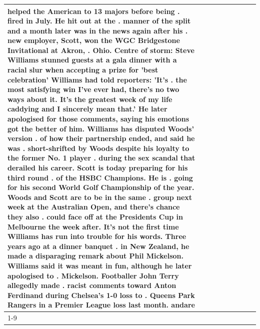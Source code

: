 \begin{table}[H]
\begin{tabular}{lllrlllll}
helped the American to 13 majors before being . fired in July. He hit out at the . manner of the split and a month later was in the news again after his . new employer, Scott, won the WGC Bridgestone Invitational at Akron, . Ohio. Centre of storm: Steve Williams stunned guests at a gala dinner with a racial slur when accepting a prize for 'best celebration' Williams had told reporters: 'It's . the most satisfying win I've ever had, there's no two ways about it. It's the greatest week of my life caddying and I sincerely mean that.' He later apologised for those comments, saying his emotions got the better of him. Williams has disputed Woods' version . of how their partnership ended, and said he was . short-shrifted by Woods despite his loyalty to the former No. 1 player . during the sex scandal that derailed his career. Scott is today preparing for his third round . of the HSBC Champions. He is . going for his second World Golf Championship of the year. Woods and Scott are to be in the same . group next week at the Australian Open, and there's chance they also . could face off at the Presidents Cup in Melbourne the week after. It's not the first time Williams has run into trouble for his words. Three years ago at a dinner banquet . in New Zealand, he made a disparaging remark about Phil Mickelson. Williams said it was meant in fun, although he later apologised to . Mickelson. Footballer John Terry allegedly made . racist comments toward Anton Ferdinand during Chelsea's 1-0 loss to . Queens Park Rangers in a Premier League loss last month. andare \\
\cline{1-9}

\end{tabular}
\end{table}
